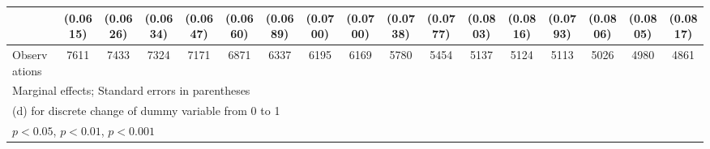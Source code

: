 {\begin{tabular}{l*{16}{c}}
                    &    (0.0615)         &    (0.0626)         &    (0.0634)         &    (0.0647)         &    (0.0660)         &    (0.0689)         &    (0.0700)         &    (0.0700)         &    (0.0738)         &    (0.0777)         &    (0.0803)         &    (0.0816)         &    (0.0793)         &    (0.0806)         &    (0.0805)         &    (0.0817)         \\
\hline
Observations        &        7611         &        7433         &        7324         &        7171         &        6871         &        6337         &        6195         &        6169         &        5780         &        5454         &        5137         &        5124         &        5113         &        5026         &        4980         &        4861         \\
\hline\hline
\multicolumn{17}{l}{\footnotesize Marginal effects; Standard errors in parentheses}\\
\multicolumn{17}{l}{\footnotesize  (d) for discrete change of dummy variable from 0 to 1}\\
\multicolumn{17}{l}{\footnotesize \sym{*} \(p<0.05\), \sym{**} \(p<0.01\), \sym{***} \(p<0.001\)}\\
\end{tabular}
}
